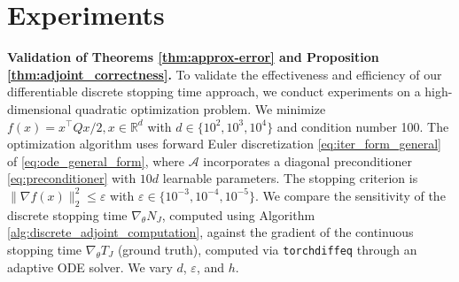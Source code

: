 \documentclass{article}
\begin{document}

\section{Experiments}
\label{sec:experiments}

\textbf{Validation of Theorems \ref{thm:approx-error} and Proposition \ref{thm:adjoint_correctness}.}
To validate the effectiveness and efficiency of our differentiable discrete stopping time approach, we conduct experiments on a high-dimensional quadratic optimization problem. We minimize $f(x) = x^\top Q x/2, x\in\mathbb{R}^d$ with $d \in \{10^2, 10^3, 10^4\}$ and condition number 100. The optimization algorithm uses forward Euler discretization \eqref{eq:iter_form_general} of \eqref{eq:ode_general_form}, where $\mathcal{A}$ incorporates a diagonal preconditioner \eqref{eq:preconditioner} with $10d$ learnable parameters. The stopping criterion is $\|\nabla f(x)\|_2^2 \le \varepsilon$ with $\varepsilon \in \{10^{-3}, 10^{-4}, 10^{-5}\}$. We compare the sensitivity of the discrete stopping time $\nabla_{\theta} N_J$, computed using Algorithm \ref{alg:discrete_adjoint_computation}, against the gradient of the continuous stopping time $\nabla_{\theta} T_J$ (ground truth), computed via \texttt{torchdiffeq} \cite{chen2018neural} through an adaptive ODE solver. We vary $d$, $\varepsilon$, and $h$.
\end{document}

